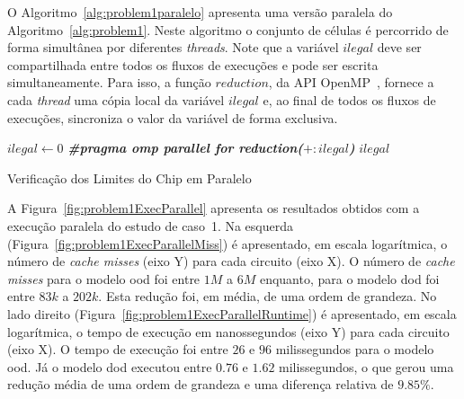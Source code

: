
O Algoritmo~\ref{alg:problem1paralelo} apresenta uma versão paralela do Algoritmo~\ref{alg:problem1}.
Neste algoritmo o conjunto de células é percorrido de forma simultânea por diferentes \textit{threads}.
Note que a variável $ilegal$ deve ser compartilhada entre todos os fluxos de execuções e pode ser escrita simultaneamente.
Para isso, a função $reduction$, da API OpenMP~\cite{openmp}, fornece a cada \textit{thread} uma cópia local da variável $ilegal$ e, ao final de todos os fluxos de execuções, sincroniza o valor da variável de forma exclusiva.


\begin{algorithm}[h!t]
	\LinesNumbered
    $ilegal \gets 0$\; \label{alg:problem1paralelo:var:initIlegal}
  	\textit{\textbf{\#pragma omp parallel for reduction(}}$+:ilegal$\textit{\textbf{)}} \hspace{20pt}  \label{alg:problem1paralelo:var:endFor}
  	\Return $ilegal$\; \label{alg:problem1paralelo:var:retorno}
	\caption{Verificação dos Limites do Chip em Paralelo} 
	\label{alg:problem1paralelo}
\end{algorithm}

A Figura~\ref{fig:problem1ExecParallel} apresenta os resultados obtidos com a execução paralela do estudo de caso~1.
Na esquerda (Figura~\ref{fig:problem1ExecParallelMiss}) é apresentado, em escala logarítmica, o número de  \textit{cache misses} (eixo Y) para cada circuito (eixo X).
O número de  \textit{cache misses} para o modelo \ac{ood} foi entre $1M$ a $6M$ enquanto, para o modelo \ac{dod} foi entre $83k$ a $202k$.
Esta redução foi, em média, de uma ordem de grandeza.
No lado direito (Figura~\ref{fig:problem1ExecParallelRuntime}) é apresentado, em escala logarítmica, o tempo de execução em nanossegundos (eixo Y) para cada circuito (eixo X).
O tempo de execução foi entre $26$ e $96$ milissegundos para o modelo \ac{ood}. Já o modelo \ac{dod} executou entre $0.76$ e $1.62$ milissegundos, o que gerou uma redução média de uma ordem de grandeza e uma diferença relativa de $9.85\%$.

